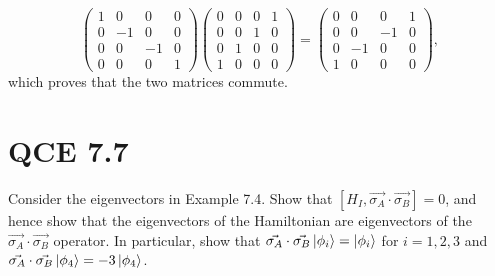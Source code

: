 \documentclass[10pt]{article}
\begin{document}
\[
\begin{pmatrix}
1 & 0   & 0  & 0 \\
0 & -1 & 0  & 0 \\
0 & 0   & -1 & 0 \\
0 & 0   & 0   & 1
\end{pmatrix}
\begin{pmatrix}
0 & 0 & 0 & 1 \\
0 & 0 & 1 & 0 \\
0 & 1 & 0 & 0 \\
1 & 0 & 0 & 0 
\end{pmatrix}
=
\begin{pmatrix}
0 & 0 & 0 & 1 \\
0 & 0 & -1 & 0 \\
0 & -1 & 0 & 0 \\
1 & 0 & 0 & 0 
\end{pmatrix},
\]
which proves that the two matrices commute.

\section*{QCE 7.7}
Consider the eigenvectors in Example 7.4. Show that $[H_I, \vec{\sigma_A} \cdot \vec{\sigma_B}] = 0$, and hence show that the eigenvectors of the Hamiltonian are eigenvectors of the $\vec{\sigma_A} \cdot \vec{\sigma_B}$ operator. In particular, show that $\vec{\sigma_A} \cdot \vec{\sigma_B} \ket{\phi_i} = \ket{\phi_i}$ for $i = 1, 2, 3$ and 
$\vec{\sigma_A} \cdot \vec{\sigma_B} \ket{\phi_4} = -3 \ket{\phi_4}$.
\end{document}
